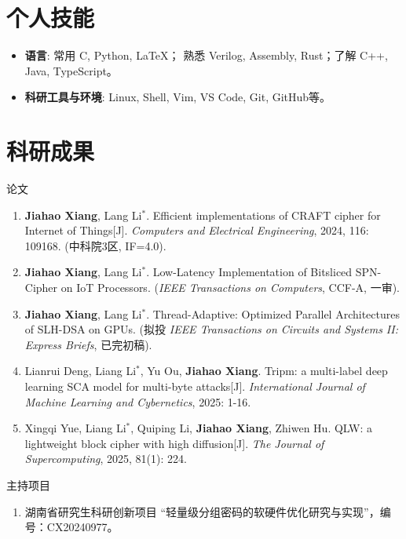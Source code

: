 \documentclass[12pt,a4paper]{article}
\begin{document}
\section*{个人技能}
{
  \begin{itemize}[leftmargin=2em]
    \item \textbf{语言}: 常用 C, Python, \LaTeX； 熟悉 Verilog, Assembly, Rust；了解 C++, Java, TypeScript。
    \item \textbf{科研工具与环境}: Linux, Shell, Vim, VS Code, Git, GitHub等。
  \end{itemize}
}

\section*{科研成果}
论文
\begin{enumerate}[leftmargin=2em]
  \item \textbf{Jiahao Xiang}, Lang Li$^*$. Efficient implementations of CRAFT cipher for Internet of Things[J]. \textit{Computers and Electrical Engineering}, 2024, 116: 109168. (中科院3区, IF=4.0).
  \item \textbf{Jiahao Xiang}, Lang Li$^*$. Low-Latency Implementation of Bitsliced SPN-Cipher on IoT Processors. (\textit{IEEE Transactions on Computers}, CCF-A, 一审).
  \item \textbf{Jiahao Xiang}, Lang Li$^*$. Thread-Adaptive: Optimized Parallel Architectures of SLH-DSA on GPUs. (拟投 \textit{IEEE Transactions on Circuits and Systems II: Express Briefs}, 已完初稿).
  \item Lianrui Deng, Liang Li$^*$, Yu Ou, \textbf{Jiahao Xiang}. Tripm: a multi-label deep learning SCA model for multi-byte attacks[J]. \textit{International Journal of Machine Learning and Cybernetics}, 2025: 1-16.
  \item Xingqi Yue, Liang Li$^*$, Quiping Li, \textbf{Jiahao Xiang}, Zhiwen Hu. QLW: a lightweight block cipher with high diffusion[J]. \textit{The Journal of Supercomputing}, 2025, 81(1): 224.
\end{enumerate}

主持项目

\begin{enumerate}[leftmargin=2em]
  \item 湖南省研究生科研创新项目 ``轻量级分组密码的软硬件优化研究与实现''，编号：CX20240977。
\end{enumerate}
\end{document}
